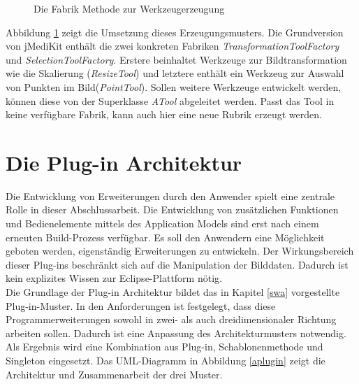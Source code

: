 \begin{figure}[htbp]
  \vspace{0.5cm}
  \centering
  \caption{Die Fabrik Methode zur Werkzeugerzeugung}
  \label{toolfactory}
  \vspace{0.5cm}
\end{figure}

Abbildung \ref{toolfactory} zeigt die Umsetzung dieses Erzeugungsmusters. Die Grundversion von jMediKit enthält die zwei konkreten Fabriken \textit{TransformationToolFactory} und \textit{SelectionToolFactory}. Erstere beinhaltet Werkzeuge zur Bildtransformation wie die Skalierung (\textit{ResizeTool}) und letztere enthält ein Werkzeug zur Auswahl von Punkten im Bild(\textit{PointTool}). Sollen weitere Werkzeuge entwickelt werden, können diese von der Superklasse \textit{ATool} abgeleitet werden. Passt das Tool in keine verfügbare Fabrik, kann auch hier eine neue Rubrik erzeugt werden.

\section{Die Plug-in Architektur}

Die Entwicklung von Erweiterungen durch den Anwender spielt eine zentrale Rolle in dieser Abschlussarbeit. Die Entwicklung von zusätzlichen Funktionen und Bedienelemente mittels des Application Models sind erst nach einem erneuten Build-Prozess verfügbar. Es soll den Anwendern eine Möglichkeit geboten werden, eigenständig Erweiterungen zu entwickeln. Der Wirkungsbereich dieser Plug-ins beschränkt sich auf die Manipulation der Bilddaten. Dadurch ist kein explizites Wissen zur Eclipse-Plattform nötig.\\
Die Grundlage der Plug-in Architektur bildet das in Kapitel \ref{swa} vorgestellte Plug-in-Muster. In den Anforderungen ist festgelegt, dass diese Programmerweiterungen sowohl in zwei- als auch dreidimensionaler Richtung arbeiten sollen. Dadurch ist eine Anpassung des Architekturmusters notwendig. Als Ergebnis wird eine Kombination aus Plug-in, Schablonenmethode und Singleton eingesetzt. Das UML-Diagramm in Abbildung \ref{aplugin} zeigt die Architektur und Zusammenarbeit der drei Muster.

